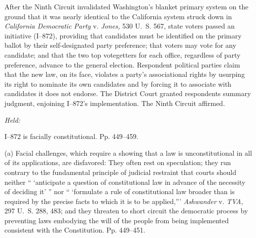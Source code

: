 
\setcounter{page}{442}

\noindent After the Ninth Circuit invalidated Washington's blanket primary
system on the ground that it was nearly identical to the California
system struck down in \emph{California Democratic Party} v. \emph{Jones,}
530 U.~S. 567, state voters passed an initiative (I--872),
providing that candidates must be identified on the primary ballot by
their self-designated party preference; that voters may vote for any
candidate; and that the two top votegetters for each office, regardless
of party preference, advance to the general election. Respondent
political parties claim that the new law, on its face, violates a
party's associational rights by usurping its right to nominate its
own candidates and by forcing it to associate with candidates it does
not endorse. The District Court granted respondents summary judgment,
enjoining I--872's implementation. The Ninth Circuit affirmed.

\emph{Held:}

\noindent I--872 is facially constitutional. Pp. 449--459.

  (a) Facial challenges, which require a showing that a law is
unconstitutional in all of its applications, are disfavored: They often
rest on speculation; they run contrary to the fundamental principle
of judicial restraint that courts should neither `` ‘anticipate a
question of constitutional law in advance of the necessity of deciding
it' '' nor `` ‘formulate a rule of constitutional law broader than
is required by the precise facts to which it is to be applied,'''
\emph{Ashwander} v. \emph{TVA,} 297 U.~S. 288, 483; and they threaten
to short circuit the democratic process by preventing laws embodying
the will of the people from being implemented consistent with the
Constitution. Pp. 449--451.

